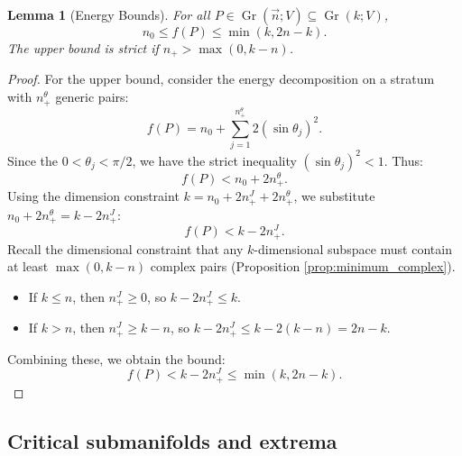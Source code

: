 \documentclass[12pt, final]{article}
\def\Gr{\operatorname{Gr}}
\newtheorem{lemma}[theorem]{Lemma}
\begin{document}
\begin{lemma}[Energy Bounds]
\label{lem:energy_bounds}
For all $P \in \Gr(\vec{n}; V) \subseteq \Gr(k; V)$,
\[ n_0 \le f(P) \le \min(k, 2n-k).\]
The upper bound is strict if $n_+ > \max(0, k-n)$.
\end{lemma}
\begin{proof}
For the upper bound, consider the energy decomposition on a stratum with $n_+^\theta$ generic pairs:
\[ f(P) = n_0 + \sum_{j=1}^{n_+^\theta} 2 (\sin \theta_j)^2. \]
Since the $0 < \theta_j < \pi/2$, we have the strict inequality $(\sin \theta_j)^2 < 1$. Thus:
\[ f(P) < n_0 + 2n_+^\theta. \]
Using the dimension constraint $k = n_0 + 2n_+^J + 2n_+^\theta$, we substitute $n_0 + 2n_+^\theta = k - 2n_+^J$:
\[ f(P) < k - 2n_+^J. \]
Recall the dimensional constraint that any $k$-dimensional subspace must contain at least $\max(0, k-n)$ complex pairs (Proposition \ref{prop:minimum_complex}).
\begin{itemize}
    \item If $k \le n$, then $n_+^J \ge 0$, so $k - 2n_+^J \le k$.
    \item If $k > n$, then $n_+^J \ge k-n$, so $k - 2n_+^J \le k - 2(k-n) = 2n - k$.
\end{itemize}
Combining these, we obtain the bound:
\[ f(P) < k - 2n_+^J \le \min(k, 2n-k). \]
\end{proof}

\subsection{Critical submanifolds and extrema} \label{subsec:critical}
\end{document}
